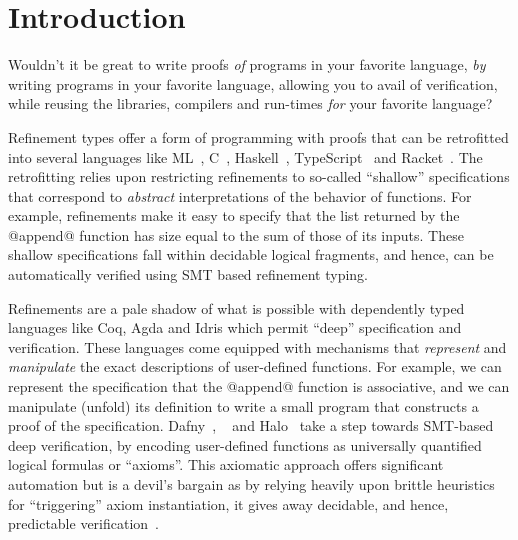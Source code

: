 \section{Introduction}\label{sec:intro}

Wouldn't it be great to write proofs \emph{of}
programs in your favorite language, \emph{by}
writing programs in your favorite language,
allowing you to avail of verification, while
reusing the libraries, compilers and run-times
\emph{for} your favorite language?

Refinement types \citep{ConstableS87,Rushby98} offer a
form of programming with proofs that can be
retrofitted into several languages like
ML~\cite{pfenningxi98,GordonRefinement09,LiquidPLDI08},
C~\cite{deputy,LiquidPOPL10},
Haskell~\citep{Vazou14}, TypeScript~\cite{Vekris16}
and Racket~\cite{RefinedRacket}.
%
The retrofitting relies upon restricting refinements
to so-called ``shallow'' specifications that
correspond to \emph{abstract} interpretations
of the behavior of functions.
%
For example, refinements make it easy to specify
that the list returned by the @append@ function
has size equal to the sum of those of its inputs.
%
These shallow specifications fall within decidable
logical fragments, and hence, can be automatically
verified using SMT based refinement typing.

Refinements are a pale shadow of what is possible
with dependently typed languages like Coq, Agda
and Idris which permit ``deep'' specification
and verification.
%
These languages come equipped with mechanisms
that \emph{represent} and \emph{manipulate} the
exact descriptions of user-defined functions.
%
For example, we can represent the specification
that the @append@ function is associative, and we
can manipulate (unfold) its definition to write a
small program that constructs a proof of the
specification.
%
Dafny~\citep{dafny}, \fstar~\citep{fstar} and
Halo~\citep{HALO} take a step towards
SMT-based deep verification, by encoding
user-defined functions as universally
quantified logical formulas or ``axioms''.
%
This axiomatic approach offers significant automation
but is a devil's bargain as by relying heavily upon
brittle heuristics for ``triggering'' axiom instantiation,
it gives away decidable, and hence, predictable
verification~\citep{Leino16}.
%
%

